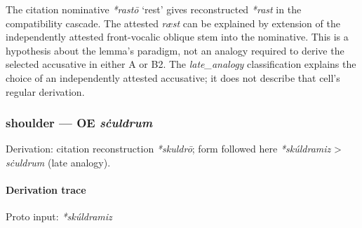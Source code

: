 \documentclass[
  british,
  a4paper,
]{article}
\providecommand{\Recon}[1]{\emph{*#1}}
\begin{document}
The citation nominative \Recon{rastō} `rest' gives reconstructed
\emph{*rast} in the compatibility cascade. The attested \emph{ræst} can
be explained by extension of the independently attested front-vocalic
oblique stem into the nominative. This is a hypothesis about the lemma's
paradigm, not an analogy required to derive the selected accusative in
either A or B2. The \emph{late\_analogy} classification explains the
choice of an independently attested accusative; it does not describe
that cell's regular derivation.

\subsubsection{\texorpdfstring{shoulder --- OE
\emph{sċuldrum}}{shoulder --- OE sċuldrum}}\label{shoulder-oe-sux10buldrum}

Derivation: citation reconstruction \emph{*skuldrō}; form followed here
\emph{*skúldramiz} \textgreater{} \emph{sċuldrum} (late analogy).

\paragraph{Derivation trace}\label{derivation-trace-167}

Proto input: \emph{*skúldramiz}

\begingroup
\setlength{\fboxsep}{6pt}
\end{document}
